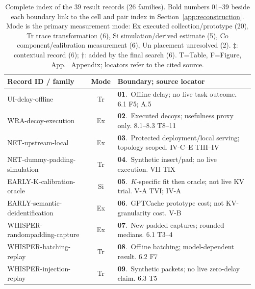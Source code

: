\begin{table}[p]\centering\scriptsize
\caption{Complete index of the 39 result records (26 families). Bold numbers 01--39 beside each boundary link to the cell and pair index in Section~\ref{app:reconstruction}. Mode is the primary measurement mode: Ex executed collection/prototype (20), Tr trace transformation (6), Si simulation/derived estimate (5), Co component/calibration measurement (6), Un placement unresolved (2). $\ddagger$: contextual record (6); $\dagger$: added by the final search (6). T=Table, F=Figure, App.=Appendix; locators refer to the cited source.}\label{tab:r9-record-index}
\setlength{\tabcolsep}{2pt}
\begin{minipage}[t]{0.495\textwidth}\vspace{0pt}
\begin{tabularx}{\linewidth}{@{}p{.36\linewidth}cY@{}}\toprule
Record ID / family & Mode & Boundary; source locator\\\midrule
\textsf{UI-delay-offline}~\cite{uitraces2026} & Tr & \textbf{01}.~Offline delay; no live task outcome. 6.1 F5; A.5\\
\textsf{WRA-decoy-execution}~\cite{jeong2026wra} & Ex & \textbf{02}.~Executed decoys; usefulness proxy only. 8.1--8.3 T8--11\\
\textsf{NET-upstream-local}~\cite{netecho2025} & Ex & \textbf{03}.~Protected deployment/local serving; topology scoped. IV-C--E TIII--IV\\
\textsf{NET-dummy-padding-simulation}~\cite{netecho2025} & Tr & \textbf{04}.~Synthetic insert/pad; no live execution. VII TIX\\
\textsf{EARLY-K-calibration-oracle}~\cite{earlybird2025} & Si & \textbf{05}.~$K$-specific fit then oracle; not live KV trial. V-A TVI; IV-A\\
\textsf{EARLY-semantic-deidentification}~\cite{earlybird2025} & Ex & \textbf{06}.~GPTCache prototype cost; not KV-granularity cost. V-B\\
\textsf{WHISPER-randompadding-capture}~\cite{whisperleak2025} & Ex & \textbf{07}.~New padded captures; rounded medians. 6.1 T3--4\\
\textsf{WHISPER-batching-replay}~\cite{whisperleak2025} & Tr & \textbf{08}.~Offline batching; model-dependent result. 6.2 F7\\
\textsf{WHISPER-injection-replay}~\cite{whisperleak2025} & Tr & \textbf{09}.~Synthetic packets; no live zero-delay claim. 6.3 T5\\

\end{tabularx}
\end{minipage}
\end{table}
